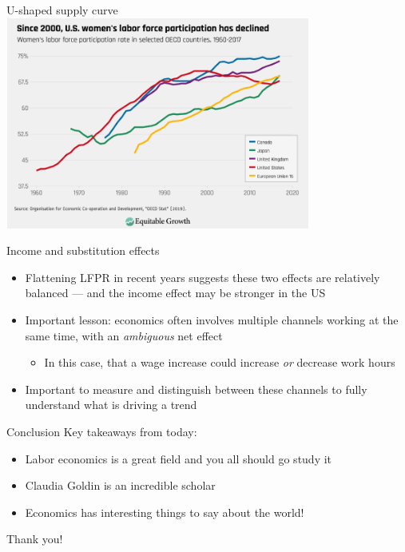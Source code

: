 \documentclass[aspectratio=169]{beamer}
\begin{document}
\begin{frame}{U-shaped supply curve}
    \centering
    \includegraphics[width = 0.75\textwidth,keepaspectratio]{./figs/since2000.png}
\end{frame}

\begin{frame}{Income and substitution effects}
    \begin{itemize}
        \item Flattening LFPR in recent years suggests these two effects are relatively balanced --- and the income effect may be stronger in the US
        \item Important lesson: economics often involves multiple channels working at the same time, with an \textit{ambiguous} net effect
        \begin{itemize}
            \item In this case, that a wage increase could increase \textit{or} decrease work hours
        \end{itemize}
        \item Important to measure and distinguish between these channels to fully understand what is driving a trend
    \end{itemize}
\end{frame}

\begin{frame}{Conclusion}
    Key takeaways from today:
    \begin{itemize}
        \item Labor economics is a great field and you all should go study it
        \item Claudia Goldin is an incredible scholar
        \item Economics has interesting things to say about the world!
    \end{itemize}

    \vspace{5mm}
    
    \centering
    \large
    Thank you!

\end{frame}
\end{document}
